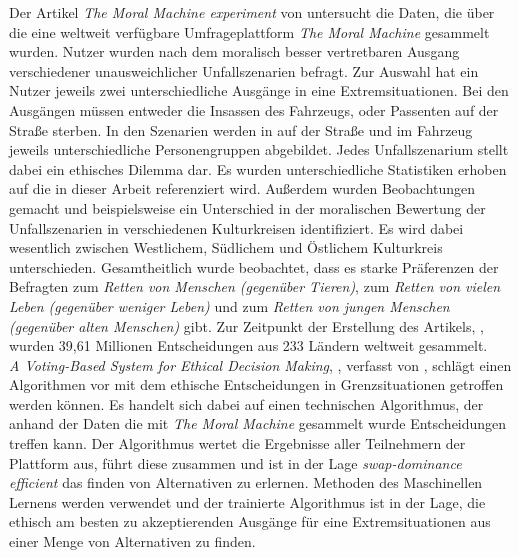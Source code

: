 Der Artikel \textit{The Moral Machine experiment} \cite{moralMachine} von \citeauthor{moralMachine} untersucht die Daten, die über die eine weltweit verfügbare Umfrageplattform \textit{The Moral Machine} gesammelt wurden. Nutzer wurden nach dem moralisch besser vertretbaren Ausgang verschiedener unausweichlicher Unfallszenarien befragt. Zur Auswahl hat ein Nutzer jeweils zwei unterschiedliche Ausgänge in eine Extremsituationen. Bei den Ausgängen müssen entweder die Insassen des Fahrzeugs, oder Passenten auf der Straße sterben. In den Szenarien werden in auf der Straße und im Fahrzeug jeweils unterschiedliche Personengruppen abgebildet. Jedes Unfallszenarium stellt dabei ein ethisches Dilemma dar. Es wurden unterschiedliche Statistiken erhoben auf die in dieser Arbeit referenziert wird. Außerdem wurden Beobachtungen gemacht und beispielsweise ein Unterschied in der moralischen Bewertung der Unfallszenarien in verschiedenen Kulturkreisen identifiziert. Es wird dabei wesentlich zwischen Westlichem, Südlichem und Östlichem Kulturkreis unterschieden. Gesamtheitlich wurde beobachtet, dass es starke Präferenzen der Befragten zum \textit{Retten von Menschen (gegenüber Tieren)}, zum \textit{Retten von vielen Leben (gegenüber weniger Leben)} und zum \textit{Retten von jungen Menschen (gegenüber alten Menschen)} gibt. Zur Zeitpunkt der Erstellung des Artikels, \citeyear{moralMachine}, wurden 39,61 Millionen Entscheidungen aus 233 Ländern weltweit gesammelt. \\


\textit{A Voting-Based System for Ethical Decision Making}, \cite{votingBasedSystem}, verfasst von \citeauthor{votingBasedSystem}, schlägt einen Algorithmen vor mit dem ethische Entscheidungen in Grenzsituationen getroffen werden können. Es handelt sich dabei auf einen technischen Algorithmus, der anhand der Daten die mit \textit{The Moral Machine} gesammelt wurde Entscheidungen treffen kann. Der Algorithmus wertet die Ergebnisse aller Teilnehmern der Plattform aus, führt diese zusammen und ist in der Lage  \textit{swap-dominance efficient} das finden von Alternativen zu erlernen. Methoden des Maschinellen Lernens werden verwendet und der trainierte Algorithmus ist in der Lage, die ethisch am besten zu akzeptierenden Ausgänge für eine Extremsituationen aus einer Menge von Alternativen zu finden.